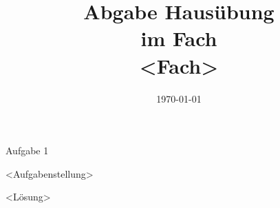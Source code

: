 \documentclass[
    ngerman,
    language=german,
    color=3b,
    submission,
    boxarc,
    fleqn,
]{rubos-tuda-template}
\date{\today}
\begin{document}

    \title[<Fach>]{Abgabe Hausübung\\im Fach\\ <Fach>}
    \maketitle{}

    \begin{task}[points=1]{Aufgabe 1}
        \begin{grayInfoBox}
             <Aufgabenstellung>
        \end{grayInfoBox}
        \loesung{} <Lösung>
    \end{task}
\end{document}
